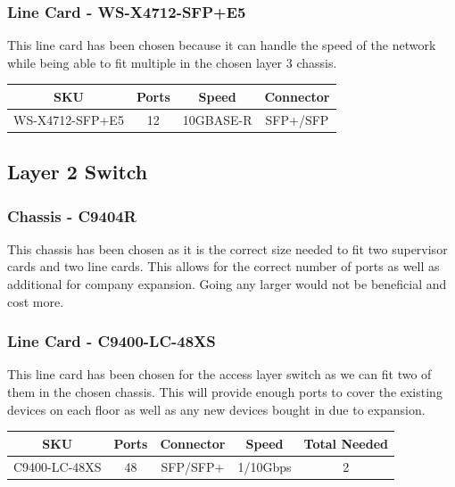 \subsubsection{Line Card - WS-X4712-SFP+E5}
This line card has been chosen because it can handle the speed of the network while being able to fit multiple in the chosen layer 3 chassis.
\begin{table}[H]
    \centering
    \begin{tabular}{|cccc|}
    \hline
    \multicolumn{1}{|c|}{SKU} & \multicolumn{1}{c|}{Ports} & \multicolumn{1}{c|}{Speed} & Connector \\ \hline
    WS-X4712-SFP+E5           & 12                         & 10GBASE-R                  & SFP+/SFP  \\ \hline
    \end{tabular}
\end{table}
\subsection{Layer 2 Switch}
\subsubsection{Chassis - C9404R}
This chassis has been chosen as it is the correct size needed to fit two supervisor cards and two line cards. This allows for the correct number of ports as well as additional for company expansion. Going any larger would not be beneficial and cost more. 
\subsubsection{Line Card - C9400-LC-48XS}
This line card has been chosen for the access layer switch as we can fit two of them in the chosen chassis. This will provide enough ports to cover the existing devices on each floor as well as any new devices bought in due to expansion.
\begin{table}[H]
    \begin{tabular}{|ccccc|}
    \hline
    \multicolumn{1}{|c|}{SKU} & \multicolumn{1}{c|}{Ports} & \multicolumn{1}{c|}{Connector} & \multicolumn{1}{c|}{Speed} & Total Needed \\ \hline
    C9400-LC-48XS             & 48                         & SFP/SFP+                       & 1/10Gbps                   & 2            \\ \hline
    \end{tabular}
\end{table}
